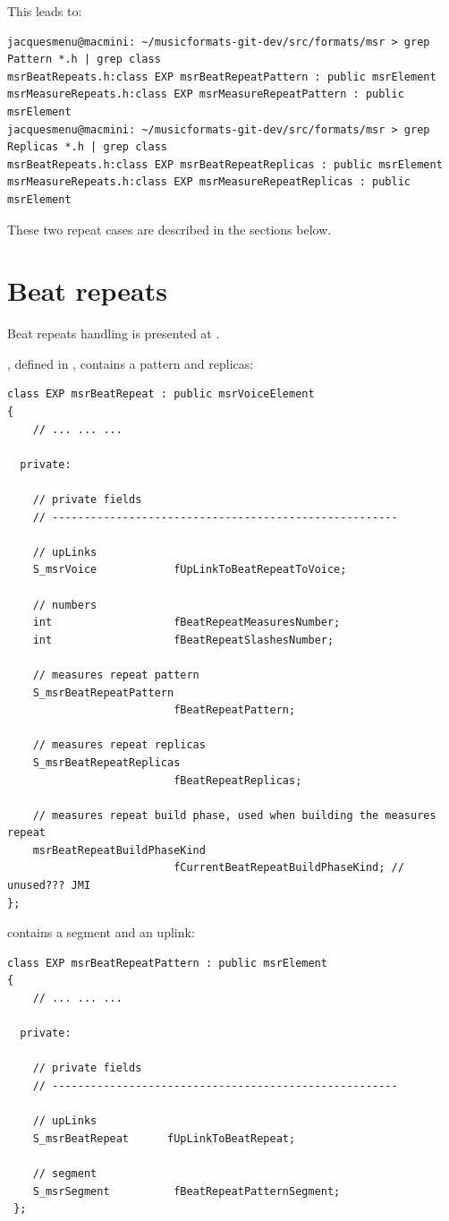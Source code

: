 This leads to:
\begin{lstlisting}[language=Terminal]
jacquesmenu@macmini: ~/musicformats-git-dev/src/formats/msr > grep Pattern *.h | grep class
msrBeatRepeats.h:class EXP msrBeatRepeatPattern : public msrElement
msrMeasureRepeats.h:class EXP msrMeasureRepeatPattern : public msrElement
jacquesmenu@macmini: ~/musicformats-git-dev/src/formats/msr > grep Replicas *.h | grep class
msrBeatRepeats.h:class EXP msrBeatRepeatReplicas : public msrElement
msrMeasureRepeats.h:class EXP msrMeasureRepeatReplicas : public msrElement
\end{lstlisting}

These two repeat cases are described in the sections below.


\section{Beat repeats}\label{Beat repeats}

Beat repeats handling is presented at .

, defined in , contains a pattern and replicas:
\begin{lstlisting}[language=CPlusPlus]
class EXP msrBeatRepeat : public msrVoiceElement
{
	// ... ... ...

  private:

    // private fields
    // ------------------------------------------------------

    // upLinks
    S_msrVoice            fUpLinkToBeatRepeatToVoice;

    // numbers
    int                   fBeatRepeatMeasuresNumber;
    int                   fBeatRepeatSlashesNumber;

    // measures repeat pattern
    S_msrBeatRepeatPattern
                          fBeatRepeatPattern;

    // measures repeat replicas
    S_msrBeatRepeatReplicas
                          fBeatRepeatReplicas;

    // measures repeat build phase, used when building the measures repeat
    msrBeatRepeatBuildPhaseKind
                          fCurrentBeatRepeatBuildPhaseKind; // unused??? JMI
};
\end{lstlisting}

 contains a segment and an uplink:
\begin{lstlisting}[language=CPlusPlus]
class EXP msrBeatRepeatPattern : public msrElement
{
	// ... ... ...

  private:

    // private fields
    // ------------------------------------------------------

    // upLinks
    S_msrBeatRepeat      fUpLinkToBeatRepeat;

    // segment
    S_msrSegment          fBeatRepeatPatternSegment;
 };
\end{lstlisting}

